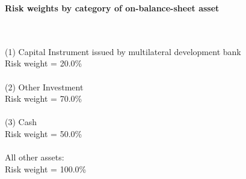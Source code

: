 \documentclass{article}
\begin{document}
\setlength{\parindent}{0em}
\begin{center}{\bf Risk weights by category of on-balance-sheet asset}\end{center}
~\\
~\\

(1) Capital Instrument issued by multilateral development bank\\
Risk weight = 20.0\%\\

~\\
(2) Other Investment\\
Risk weight = 70.0\%\\

~\\
(3) Cash\\
Risk weight = 50.0\%\\

~\\
All other assets:\\
Risk weight = 100.0\%\\

~\\
\end{document}
